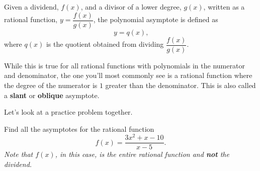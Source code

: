 \begin{definition} %
    Given a dividend, $f(x)$, and a divisor of a lower degree, $g(x)$, written as a rational function, $y = \dfrac{f(x)}{g(x)}$, the polynomial asymptote is defined as 
    \[
        y = q(x) \text{,}
    \]
     where $q(x)$ is the quotient obtained from dividing $\dfrac{f(x)}{g(x)}$.
\end{definition}
\clearpage
While this is true for all rational functions with polynomials in the numerator and denominator, the one you'll most commonly see is a rational function where the degree of the numerator is $1$ greater than the denominator. This is also called a \textbf{slant} or \textbf{oblique} asymptote.

Let's look at a practice problem together.
\begin{problem}
    Find all the asymptotes for the rational function
    \[
        f(x) = \frac{3x^2 + x - 10}{x - 5} \text{.}
    \]
    \textit{Note that $f(x)$, in this case, is the entire rational function and \textbf{not} the dividend.}
\end{problem}

